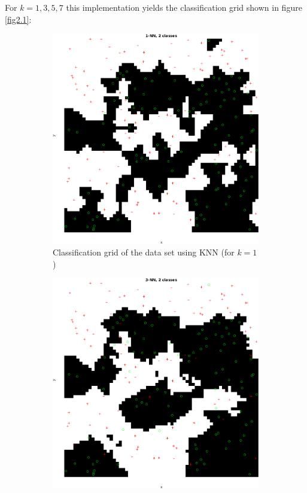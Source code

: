 \documentclass[10pt]{article}
\begin{document}
\subsection{}
For $k={1, 3, 5, 7}$ this implementation yields the classification grid shown in figure \ref{fig2.1}:
\begin{figure}[H]
  \centering
  \begin{subfigure}{.49\textwidth}
    \includegraphics[width=1\linewidth]{assign2_2_1.png}
    \caption{Classification grid of the data set using KNN (for $k=1$)}
    \label{fig2.1a}
  \end{subfigure}
  \begin{subfigure}{.49\textwidth}
    \includegraphics[width=1\linewidth]{assign2_2_3.png}

\end{subfigure}
\end{figure}
\end{document}
